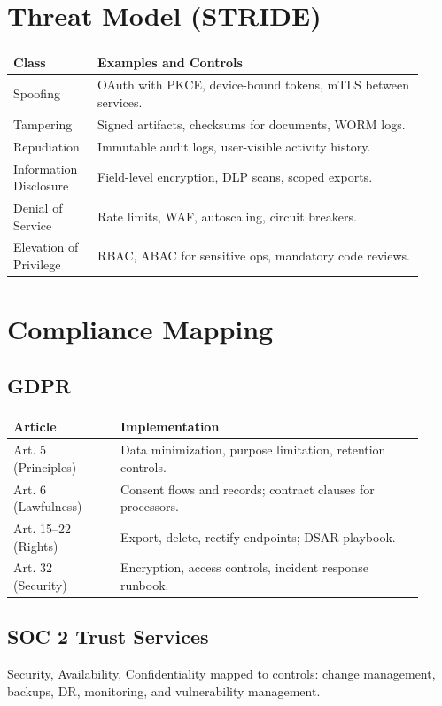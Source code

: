 \documentclass[12pt,a4paper]{article}
\begin{document}
\section{Threat Model (STRIDE)}
\begin{longtable}{p{0.18\linewidth} p{0.74\linewidth}}
\toprule
\textbf{Class} & \textbf{Examples and Controls}\\
\midrule
Spoofing & OAuth with PKCE, device-bound tokens, mTLS between services.\\
Tampering & Signed artifacts, checksums for documents, WORM logs.\\
Repudiation & Immutable audit logs, user-visible activity history.\\
Information Disclosure & Field-level encryption, DLP scans, scoped exports.\\
Denial of Service & Rate limits, WAF, autoscaling, circuit breakers.\\
Elevation of Privilege & RBAC, ABAC for sensitive ops, mandatory code reviews.\\
\bottomrule
\end{longtable}

\section{Compliance Mapping}
\subsection{GDPR}
\begin{longtable}{p{0.24\linewidth} p{0.68\linewidth}}
\toprule
\textbf{Article} & \textbf{Implementation}\\
\midrule
Art. 5 (Principles) & Data minimization, purpose limitation, retention controls.\\
Art. 6 (Lawfulness) & Consent flows and records; contract clauses for processors.\\
Art. 15--22 (Rights) & Export, delete, rectify endpoints; DSAR playbook.\\
Art. 32 (Security) & Encryption, access controls, incident response runbook.\\
\bottomrule
\end{longtable}
\subsection{SOC 2 Trust Services}
Security, Availability, Confidentiality mapped to controls: change management, backups, DR, monitoring, and vulnerability management.
\end{document}
